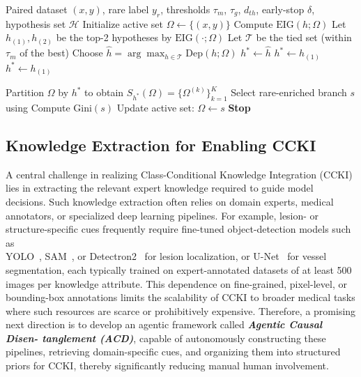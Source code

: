\documentclass[runningheads]{llncs}
\begin{document}
\begin{algorithm}[t]
\scriptsize
\caption{Class-Conditional Knowledge Integration (CCKI)}
\label{alg:ccki}
\begin{algorithmic}[1]
\Require Paired dataset $(x,y)$, rare label $y_r$, thresholds $\tau_m$, $\tau_g$, $d_{th}$, early-stop $\delta$, hypothesis set $\mathcal{H}$
\State Initialize active set $\Omega \leftarrow \{(x,y)\}$
        \State Compute $\mathrm{EIG}(h;\Omega)$ %
    \EndFor
    \State Let $h_{(1)},h_{(2)}$ be the top-2 hypotheses by $\mathrm{EIG}(\cdot;\Omega)$
     
        \State Let $\mathcal{T}$ be the tied set (within $\tau_m$ of the best)
        \State Choose $\hat{h}=\arg\max_{h\in\mathcal{T}} \mathrm{Dep}(h;\Omega)$ %
            \State $h^* \leftarrow \hat{h}$
        \Else
            \State $h^* \leftarrow h_{(1)}$ 
        \EndIf
    \Else
        \State $h^* \leftarrow h_{(1)}$
    \EndIf

    \State Partition $\Omega$ by $h^*$ to obtain $S_{h^*}(\Omega)=\{\Omega^{(k)}\}_{k=1}^{K}$
    \State Select rare-enriched branch $s$ using %
    \State Compute $\mathrm{Gini}(s)$
        \State Update active set: $\Omega \leftarrow s$
    \Else
        \State \textbf{Stop}
    \EndIf
\EndWhile
\end{algorithmic}
\end{algorithm}
\subsection{Knowledge Extraction for Enabling CCKI}
A central challenge in realizing Class-Conditional Knowledge Integration (CCKI) lies in extracting the relevant expert knowledge required to guide model decisions. Such knowledge extraction often relies on domain experts, medical annotators, or specialized deep learning pipelines. For example, lesion- or structure-specific cues frequently require fine-tuned object-detection models such as \\
YOLO~\cite{redmon2016yolo}, SAM~\cite{kirillov2023sam}, or Detectron2~\cite{wu2019detectron2} for lesion localization, or U-Net~\cite{ronneberger2015unet} for vessel segmentation, each typically trained on expert-annotated datasets of at least 500 images per knowledge attribute. This dependence on fine-grained, pixel-level, or bounding-box annotations limits the scalability of CCKI to broader medical tasks where such resources are scarce or prohibitively expensive. Therefore, a promising next direction is to develop an agentic framework called  \textbf{\textit{Agentic Causal Disen-
tanglement (ACD)}}, capable of autonomously constructing these pipelines, retrieving domain-specific cues, and organizing them into structured priors for CCKI, thereby significantly reducing manual human involvement.
\end{document}
